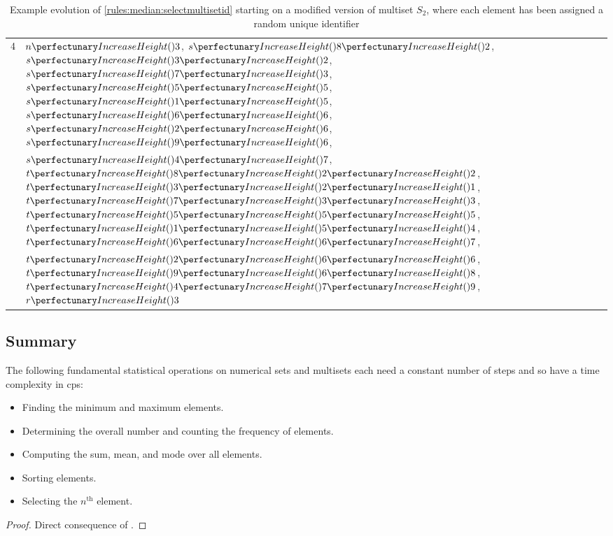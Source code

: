\begin{table}[htbp]
\begin{tabular}{|r|l|}
    4 & \(\cpfunc{n}{3}\), \(\cpfuncn{s}{8}{2}\), \(\cpfuncn{s}{3}{2}\), \(\cpfuncn{s}{7}{3}\), \(\cpfuncn{s}{5}{5}\), \(\cpfuncn{s}{1}{5}\), \(\cpfuncn{s}{6}{6}\), \(\cpfuncn{s}{2}{6}\), \(\cpfuncn{s}{9}{6}\),\\& \(\cpfuncn{s}{4}{7}\), \(\cpfuncnn{t}{8}{2}{2}\), \(\cpfuncnn{t}{3}{2}{1}\), \(\cpfuncnn{t}{7}{3}{3}\), \(\cpfuncnn{t}{5}{5}{5}\), \(\cpfuncnn{t}{1}{5}{4}\), \(\cpfuncnn{t}{6}{6}{7}\),\\& \(\cpfuncnn{t}{2}{6}{6}\), \(\cpfuncnn{t}{9}{6}{8}\), \(\cpfuncnn{t}{4}{7}{9}\), \(\cpfunc{r}{3}\)\\ \hline
    
\end{tabular} 
\caption[Example evolution of \cref{rules:median:selectmultisetid} to select the \(n^{\text{th}}\) element in a sorted multiset]{\label{tab:median:selectmultisetid}Example evolution of \cref{rules:median:selectmultisetid} starting on a modified version of multiset \(S_2\), where each element has been assigned a random unique identifier}
\end{table}

\subsection{Summary}

\begin{theorem}
The following fundamental statistical operations on numerical sets and multisets each need a constant number of steps and so have a time complexity  in \gls{cps}:
\begin{itemize}
    \item Finding the minimum and maximum elements.
    \item Determining the overall number and counting the frequency of elements.
    \item Computing the sum, mean, and mode over all elements.
    \item Sorting elements.
    \item Selecting the \(n^{\text{th}}\) element.
\end{itemize}
\end{theorem}

\begin{proof}
Direct consequence of .
\end{proof}

